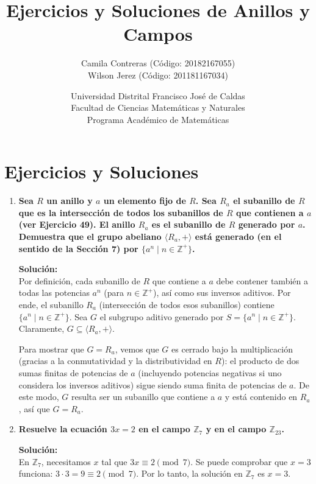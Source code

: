 \documentclass[12pt]{article}
\title{Ejercicios y Soluciones de Anillos y Campos}
\author{
    Camila Contreras (Código: 20182167055) \\
    Wilson Jerez (Código: 201181167034)
}
\date{
    Universidad Distrital Francisco José de Caldas \\
    Facultad de Ciencias Matemáticas y Naturales \\
    Programa Académico de Matemáticas
}
\theoremstyle{definition}
\theoremstyle{remark}
\begin{document}
\maketitle

\section*{Ejercicios y Soluciones}

\begin{enumerate}[label=\textbf{\arabic*.}]

\item \textbf{Sea $R$ un anillo y $a$ un elemento fijo de $R$. Sea $R_a$ el subanillo de $R$ que es la intersección de todos los subanillos de $R$ que contienen a $a$ (ver Ejercicio 49). El anillo $R_a$ es el subanillo de $R$ generado por $a$. Demuestra que el grupo abeliano $\langle R_a, + \rangle$ está generado (en el sentido de la Sección 7) por $\{a^n \mid n \in \mathbb{Z}^+\}$.}

\textbf{Solución:}\\
Por definición, cada subanillo de $R$ que contiene a $a$ debe contener también a todas las potencias $a^n$ (para $n \in \mathbb{Z}^+$), así como sus inversos aditivos. Por ende, el subanillo $R_a$ (intersección de todos esos subanillos) contiene $\{a^n \mid n \in \mathbb{Z}^+\}$. Sea $G$ el subgrupo aditivo generado por $S = \{a^n \mid n \in \mathbb{Z}^+\}$. Claramente, $G \subseteq \langle R_a, +\rangle$.

\medskip

Para mostrar que $G = R_a$, vemos que $G$ es cerrado bajo la multiplicación (gracias a la conmutatividad y la distributividad en $R$): el producto de dos sumas finitas de potencias de $a$ (incluyendo potencias negativas si uno considera los inversos aditivos) sigue siendo suma finita de potencias de $a$. De este modo, $G$ resulta ser un subanillo que contiene a $a$ y está contenido en $R_a$, así que $G = R_a$. 


\item \textbf{Resuelve la ecuación $3x = 2$ en el campo $\mathbb{Z}_7$ y en el campo $\mathbb{Z}_{23}$.}

\textbf{Solución:}\\
En $\mathbb{Z}_7$, necesitamos $x$ tal que $3x \equiv 2 \pmod{7}$. 
Se puede comprobar que $x = 3$ funciona: $3\cdot 3 = 9 \equiv 2 \pmod{7}$.  
Por lo tanto, la solución en $\mathbb{Z}_7$ es $x=3$.


\end{enumerate}
\end{document}
